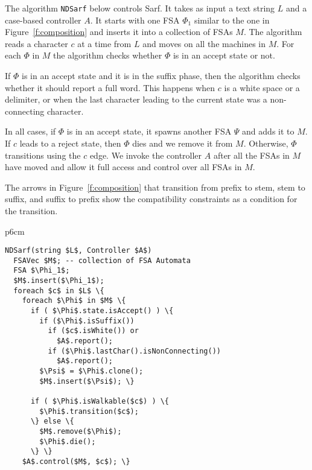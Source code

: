 \documentclass[11pt,letterpaper]{article}
\newcommand{\CodeIn}[1]{{\small\texttt{#1}}}
\begin{document}
\begin{figure*}[tb]
\end{figure*}

The algorithm \CodeIn{NDSarf} below controls Sarf. 
It takes as input a text string $L$ and a case-based controller
$A$. 
It starts with one FSA $\Phi_1$ similar to the one in 
Figure~\ref{f:composition} and inserts it into a collection
of FSAs $M$. 
The algorithm reads a character $c$ at a time from $L$
and moves on all the machines in $M$. 
For each $\Phi$ in $M$ the algorithm checks whether
$\Phi$ is in an accept state or not. 

If $\Phi$ is in an accept state and it is in the suffix
phase, then the algorithm checks whether it should report
a full word. 
This happens when $c$ is a white space or a delimiter, 
or when the last character leading to the current state
was a non-connecting character. 

In all cases, if $\Phi$ is in an accept state, 
it spawns another FSA $\Psi$ and adds it to $M$. 
If $c$ leads to a reject state, then $\Phi$ dies 
and we remove it from $M$. 
Otherwise, $\Phi$ transitions using the $c$ edge.
We invoke the controller $A$ after all the FSAs in $M$ 
have moved and allow it full access and control over
all FSAs in $M$. 

The arrows in Figure~\ref{f:composition} that transition
from prefix to stem, stem to suffix, and suffix to prefix
show the compatibility constraints as a condition for 
the transition.

\begin{table}[tb]
\centering
\begin{tabular} {p{6cm}}
\begin{Verbatim}[fontsize=\relsize{-1},
frame=topline,framesep=4mm,label=\fbox{NDSarf algorithm},
commandchars=\\\{\}, codes={\catcode`$=3\catcode`_=8}]
NDSarf(string $L$, Controller $A$) 
  FSAVec $M$; -- collection of FSA Automata
  FSA $\Phi_1$;
  $M$.insert($\Phi_1$);
  foreach $c$ in $L$ \{
    foreach $\Phi$ in $M$ \{
      if ( $\Phi$.state.isAccept() ) \{
        if ($\Phi$.isSuffix())
          if ($c$.isWhite()) or 
            $A$.report();
          if ($\Phi$.lastChar().isNonConnecting())
            $A$.report();
        $\Psi$ = $\Phi$.clone();
        $M$.insert($\Psi$); \}

      if ( $\Phi$.isWalkable($c$) ) \{
        $\Phi$.transition($c$);
      \} else \{
        $M$.remove($\Phi$);
        $\Phi$.die();
      \} \} 
    $A$.control($M$, $c$); \}
\end{Verbatim}
\end{tabular}
\label{a:ndsarf}
\end{table}
\end{document}
